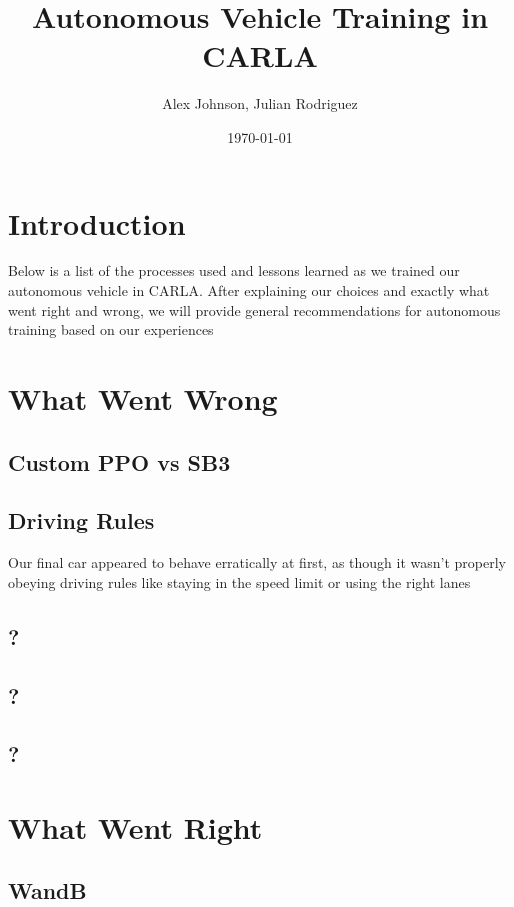 \documentclass{article}
\title{Autonomous Vehicle Training in CARLA}
\author{Alex Johnson, Julian Rodriguez}
\date{\today}
\begin{document}
\maketitle

\section{Introduction}
Below is a list of the processes used and lessons learned 
as we trained our autonomous vehicle in CARLA. After explaining
our choices and exactly what went right and wrong, we will 
provide general recommendations for autonomous training based
on our experiences

\section{What Went Wrong}

\subsection{Custom PPO vs SB3}
\subsection{Driving Rules}
Our final car appeared to behave erratically at first, as though it wasn't
properly obeying driving rules like staying in the speed limit or using the
right lanes
\paragraph{}

\subsection{?}
\subsection{?}
\subsection{?}

\section{What Went Right}

\subsection{
WandB
}
\end{document}
